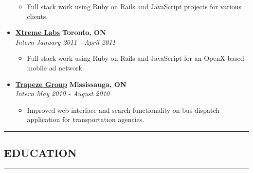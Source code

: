 \documentclass[10pt,letterpaper]{article}
\begin{document}
\begin{itemize}[leftmargin=*]
    \begin{itemize}[label=\textbullet]
      \itemsep0em
      \item Full stack work using Ruby on Rails and JavaScript projects for various
      clients.
    \end{itemize}
    
    \item[]
    {\href{http://www.xtremelabs.com/}{\textbf{Xtreme Labs}} \hfill
      \textbf{Toronto, ON}}
    \\
    {\emph{Intern} \hfill \emph{January 2011 - April 2011}}
    
    \begin{itemize}[label=\textbullet]
      \itemsep0em
      \item Full stack work using Ruby on Rails and JavaScript for an OpenX
      based mobile ad network.
    \end{itemize}
    
    \item[]
    {\href{http://www.trapezegroup.com/}{\textbf{Trapeze Group}} \hfill
      \textbf{Mississauga, ON}}
    \\
    {\emph{Intern} \hfill \emph{May 2010 - August 2010}}
    
    \begin{itemize}[label=\textbullet]
      \itemsep0em
      \item Improved web interface and search functionality on bus dispatch
      application for transportation agencies.
    \end{itemize}
  \end{itemize}
  
  
  
  \hrule
  \vspace{-1.0em}
  \subsection*{EDUCATION}
  \hrule
  \vspace{0.6em}
  
\end{document}
